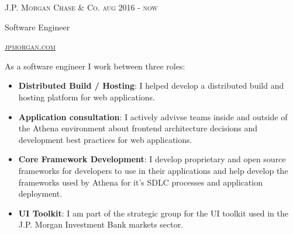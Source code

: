 
\raggedright

\textsc{\small{
	J.P. Morgan Chase \& Co. 
   	\hfill	
   	{\raggedleft aug 2016 - now}
}}
  
{\large Software Engineer}

\textsc{\small\href{http://www.jpmorgan.com}{jpmorgan.com}}


As a software engineer I work between three roles:
\begin{itemize}

\item \textbf{Distributed Build / Hosting}: I helped develop a distributed build and hosting platform for web applications.

\item \textbf{Application consultation}: I actively advivse teams inside and outside of the Athena environment about frontend architecture decisions and development best practices for web applications.

\item \textbf{Core Framework Development}: I develop proprietary and open source frameworks for developers to use in their applications and help develop the frameworks used by Athena for it's SDLC processes and application deployment.

\item \textbf{UI Toolkit}: I am part of the strategic group for the UI toolkit used in the J.P. Morgan Investment Bank markets sector.

\end{itemize}
